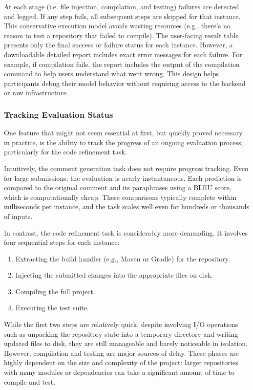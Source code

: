 At each stage (i.e. file injection, compilation, and testing) failures are detected and logged. If
any step fails, all subsequent steps are skipped for that instance. This conservative execution
model avoids wasting resources (e.g., there's no reason to test a repository that failed to
compile). The user-facing result table presents only the final success or failure status for each
instance. However, a downloadable detailed report includes exact error messages for each failure.
For example, if compilation fails, the report includes the output of the compilation command to help
users understand what went wrong. This design helps participants debug their model behavior without
requiring access to the backend or raw infrastructure.


\subsubsection{Tracking Evaluation Status}

One feature that might not seem essential at first, but quickly proved necessary in practice, is the
ability to track the progress of an ongoing evaluation process, particularly for the code refinement
task.

Intuitively, the comment generation task does not require progress tracking. Even for large
submissions, the evaluation is nearly instantaneous. Each prediction is compared to the original
comment and its paraphrases using a BLEU score, which is computationally cheap. These comparisons
typically complete within milliseconds per instance, and the task scales well even for hundreds or
thousands of inputs.

In contrast, the code refinement task is considerably more demanding. It involves four sequential
steps for each instance:
\begin{enumerate}
	\item Extracting the build handler (e.g., Maven or Gradle) for the repository.
	\item Injecting the submitted changes into the appropriate files on disk.
	\item Compiling the full project.
	\item Executing the test suite.
\end{enumerate}

While the first two steps are relatively quick, despite involving I/O operations such as unpacking
the repository state into a temporary directory and writing updated files to disk, they are still
manageable and barely noticeable in isolation. However, compilation and testing are major sources of
delay. These phases are highly dependent on the size and complexity of the project: larger
repositories with many modules or dependencies can take a significant amount of time to compile and
test.

